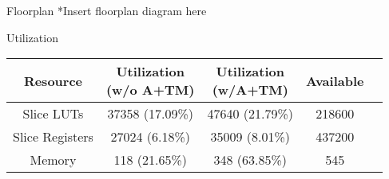 \begin{block}{Floorplan}
*Insert floorplan diagram here



Utilization

\begin{center}
\begin{tabular}{ | c | c | c | c | c |} \hline
    Resource        & \pbox{20cm}{Utilization \\ (w/o A+TM)} & \pbox{20cm}{Utilization \\ (w/A+TM)} & Available \\ \hline
    Slice LUTs      & 37358 (17.09\%)        &  47640 (21.79\%)              & 218600    \\  \hline
    Slice Registers & 27024 (6.18\%)         &  35009 (8.01\%)               & 437200    \\  \hline
    Memory          & 118   (21.65\%)        &  348 (63.85\%)                & 545       \\  
\end{tabular}
\end{center}




\end{block}
